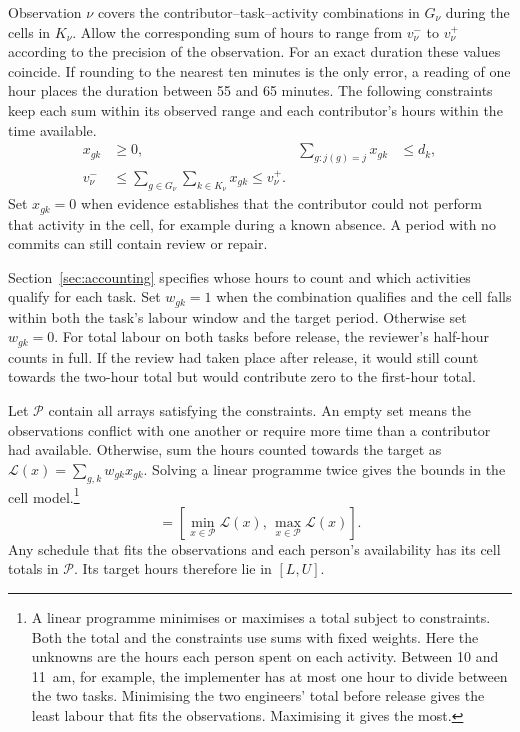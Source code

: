 Observation $\nu$ covers the contributor--task--activity combinations in $G_\nu$ during the cells in $K_\nu$. Allow the corresponding sum of hours to range from $v^-_\nu$ to $v^+_\nu$ according to the precision of the observation. For an exact duration these values coincide. If rounding to the nearest ten minutes is the only error, a reading of one hour places the duration between 55 and 65 minutes. The following constraints keep each sum within its observed range and each contributor's hours within the time available.
\begin{align}
 x_{gk} &\ge 0, &
 \sum_{g:j(g)=j}x_{gk} &\le d_k,\\
 v^-_\nu &\le \sum_{g\in G_\nu}\sum_{k\in K_\nu}x_{gk}
 \le v^+_\nu.
\end{align}
Set $x_{gk}=0$ when evidence establishes that the contributor could not perform that activity in the cell, for example during a known absence. A period with no commits can still contain review or repair.

Section~\ref{sec:accounting} specifies whose hours to count and which activities qualify for each task. Set $w_{gk}=1$ when the combination qualifies and the cell falls within both the task's labour window and the target period. Otherwise set $w_{gk}=0$. For total labour on both tasks before release, the reviewer's half-hour counts in full. If the review had taken place after release, it would still count towards the two-hour total but would contribute zero to the first-hour total.

Let $\mathcal P$ contain all arrays satisfying the constraints. An empty set means the observations conflict with one another or require more time than a contributor had available. Otherwise, sum the hours counted towards the target as $\mathcal L(x)=\sum_{g,k}w_{gk}x_{gk}$. Solving a linear programme twice gives the bounds in the cell model.\footnote{A linear programme minimises or maximises a total subject to constraints. Both the total and the constraints use sums with fixed weights. Here the unknowns are the hours each person spent on each activity. Between 10 and 11~am, for example, the implementer has at most one hour to divide between the two tasks. Minimising the two engineers' total before release gives the least labour that fits the observations. Maximising it gives the most.}
\begin{equation}
  [L,U]=\left[\min_{x\in\mathcal P}\mathcal L(x),\,
                    \max_{x\in\mathcal P}\mathcal L(x)\right].
  \label{eq:labour-bounds}
\end{equation}
Any schedule that fits the observations and each person's availability has its cell totals in $\mathcal P$. Its target hours therefore lie in $[L,U]$.

